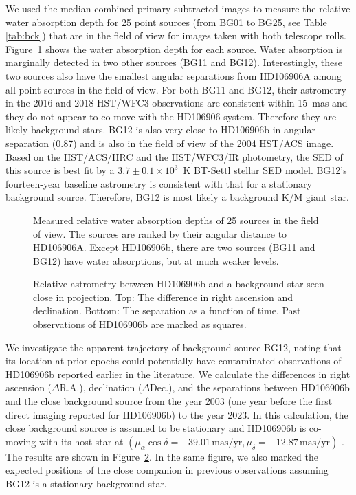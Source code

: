 \documentclass[twocolumn, trackchanges]{aastex62}
\begin{document}
We used the median-combined primary-subtracted images to measure the relative water absorption depth for 25 point sources (from BG01 to BG25, see Table \ref{tab:bck}) that are in the field of view for images taken with both telescope rolls. Figure~\ref{fig:backgroundsources} shows the water absorption depth for each source.  Water absorption is marginally detected in two other sources (BG11 and BG12). Interestingly, these two sources also have the smallest angular separations from HD106906A among all point sources in the field of view. For both BG11 and BG12, their astrometry in the 2016 and 2018 HST/WFC3 observations are consistent within 15~mas and they do not appear to co-move with the HD106906 system. Therefore they are likely background stars.  BG12 {is also very close to HD106906b in angular separation} (0.87\arcsec) and is also in the field of view of the 2004 HST/ACS image.   Based on the HST/ACS/HRC and the HST/WFC3/IR photometry, the SED of this source is best fit by a $3.7\pm0.1\times10^{3}$~K BT-Settl stellar SED model. BG12's fourteen-year baseline astrometry is consistent with that for a stationary background source. Therefore, BG12 is most likely a background K/M giant star. 

\begin{figure}
  \centering
  \caption{Measured relative water absorption depths of 25 sources in the field of view. The sources are ranked by their angular distance to HD106906A. Except HD106906b, there are two sources (BG11 and BG12) have water absorptions, but at much weaker levels.}
  \label{fig:backgroundsources}
\end{figure}

\begin{figure}[!ht]
  \centering
  \caption{Relative astrometry between HD106906b and a background star seen close in projection. Top: The difference in right ascension and declination. Bottom: The separation as a function of time. Past observations of HD106906b are marked as squares.}
  \label{fig:astrometry:bck}
\end{figure}

We investigate the {apparent trajectory} of background source BG12, {noting that its location at prior epochs could potentially have contaminated observations of HD106906b reported earlier in the literature}.  We calculate  the differences in right ascension ($\Delta${R.A.}),  declination ($\Delta${Dec.}), and the separations between HD106906b and the close background source from the year 2003 (one year before the first direct imaging {reported for} HD106906b) to the year 2023. In this calculation, the close background source is assumed to be stationary and HD106906b is co-moving with its host star at $(\mu_\alpha\cos\delta=-39.01\,\mbox{mas/yr}, \mu_{\delta}=-12.87\,\mbox{mas/yr})$ \citep{Gaia2016, Gaia2018}. The results are shown in Figure~\ref{fig:astrometry:bck}. In the same figure, we also marked the expected positions of the close companion in previous observations \citep{Bailey2013, Wu2016, Lagrange2016, Daemgen2017} assuming BG12 is a stationary background star.
\end{document}
